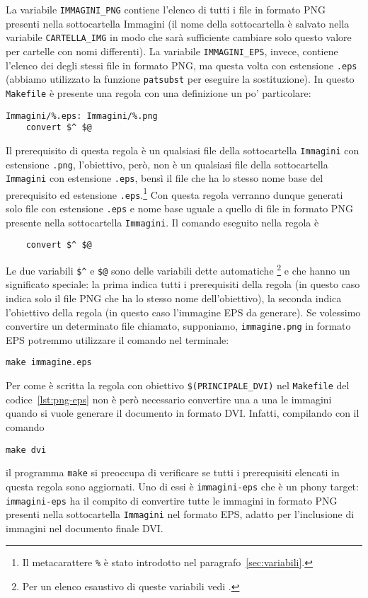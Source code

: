 La variabile \verb|IMMAGINI_PNG| contiene l'elenco di tutti i file in formato
\textsc{PNG} presenti nella sottocartella Immagini (il nome della sottocartella
è salvato nella variabile \verb|CARTELLA_IMG| in modo che sarà sufficiente
cambiare solo questo valore per cartelle con nomi differenti).  La variabile
\verb|IMMAGINI_EPS|, invece, contiene l'elenco dei degli stessi file in formato
\textsc{PNG}, ma questa volta con estensione \verb|.eps| (abbiamo utilizzato la
funzione \verb|patsubst| per eseguire la sostituzione).  In questo
\verb|Makefile| è presente una regola con una definizione un po' particolare:
\begin{lstlisting}
Immagini/%.eps: Immagini/%.png
	convert $^ $@
\end{lstlisting}
Il prerequisito di questa regola è un qualsiasi file della sottocartella
\verb|Immagini| con estensione \verb|.png|, l'obiettivo, però, non è un
qualsiasi file della sottocartella \verb|Immagini| con estensione \verb|.eps|,
bensì il file che ha lo stesso nome base del prerequisito ed estensione
\verb|.eps|.\footnote{Il metacarattere \texttt{\%} è stato introdotto nel
  paragrafo~\ref{sec:variabili}.}
Con questa regola verranno dunque generati solo file con estensione \verb|.eps|
e nome base uguale a quello di file in formato \textsc{PNG} presente nella
sottocartella \verb|Immagini|.  Il comando eseguito nella regola è
\begin{lstlisting}
	convert $^ $@
\end{lstlisting}
Le due variabili \verb|$^| e \verb|$@| sono delle variabili dette automatiche%
\footnote{Per un elenco esaustivo di queste variabili vedi
  \textcite[112]{gnu:make}.}
e che hanno un significato speciale: la prima indica tutti i prerequisiti della
regola (in questo caso indica solo il file \textsc{PNG} che ha lo stesso nome
dell'obiettivo), la seconda indica l'obiettivo della regola (in questo caso
l'immagine \textsc{EPS} da generare).  Se volessimo convertire un determinato
file chiamato, supponiamo, \verb|immagine.png| in formato \textsc{EPS} potremmo
utilizzare il comando nel terminale:
\begin{verbatim}
make immagine.eps
\end{verbatim}
Per come è scritta la regola con obiettivo \verb|$(PRINCIPALE_DVI)|
nel \verb|Makefile| del codice~\ref{lst:png-eps} non è però necessario
convertire una a una le immagini quando si vuole generare il documento in
formato \textsc{DVI}.  Infatti, compilando con il comando
\begin{verbatim}
make dvi
\end{verbatim}
il programma \verb|make| si preoccupa di verificare se tutti i prerequisiti
elencati in questa regola sono aggiornati.  Uno di essi è \verb|immagini-eps|
che è un phony target: \verb|immagini-eps| ha il compito di convertire tutte le
immagini in formato \textsc{PNG} presenti nella sottocartella \verb|Immagini|
nel formato \textsc{EPS}, adatto per l'inclusione di immagini nel documento
finale \textsc{DVI}.

